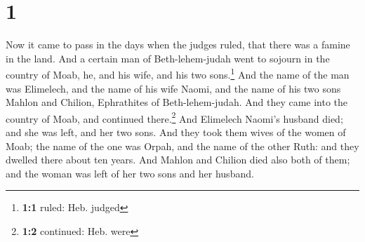 \hypertarget{section}{%
\section{1}\label{section}}

 Now it came to pass in the days when the judges ruled,
that there was a famine in the land. And a certain man of
Beth-lehem-judah went to sojourn in the country of Moab, he, and his
wife, and his two sons.\footnote{\textbf{1:1} ruled: Heb. judged}
 And the name of the man was Elimelech, and the name of
his wife Naomi, and the name of his two sons Mahlon and Chilion,
Ephrathites of Beth-lehem-judah. And they came into the country of Moab,
and continued there.\footnote{\textbf{1:2} continued: Heb. were}
 And Elimelech Naomi's husband died; and she was left, and
her two sons.  And they took them wives of the women of
Moab; the name of the one was Orpah, and the name of the other Ruth: and
they dwelled there about ten years.  And Mahlon and
Chilion died also both of them; and the woman was left of her two sons
and her husband.

